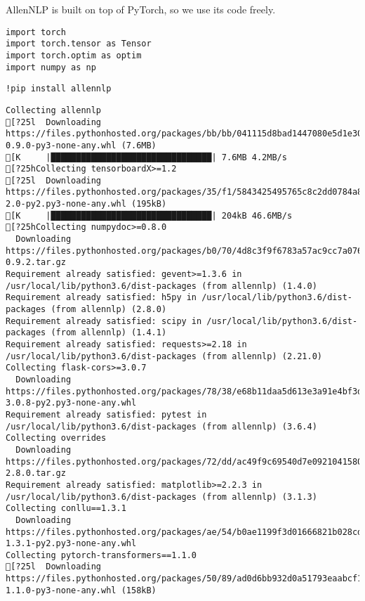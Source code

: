 \documentclass[
]{article}
\begin{document}
AllenNLP is built on top of PyTorch, so we use its code freely.

\begin{verbatim}
import torch
import torch.tensor as Tensor
import torch.optim as optim
import numpy as np
\end{verbatim}

\begin{verbatim}
!pip install allennlp
\end{verbatim}

\begin{verbatim}
Collecting allennlp
[?25l  Downloading https://files.pythonhosted.org/packages/bb/bb/041115d8bad1447080e5d1e30097c95e4b66e36074277afce8620a61cee3/allennlp-0.9.0-py3-none-any.whl (7.6MB)
[K     |████████████████████████████████| 7.6MB 4.2MB/s 
[?25hCollecting tensorboardX>=1.2
[?25l  Downloading https://files.pythonhosted.org/packages/35/f1/5843425495765c8c2dd0784a851a93ef204d314fc87bcc2bbb9f662a3ad1/tensorboardX-2.0-py2.py3-none-any.whl (195kB)
[K     |████████████████████████████████| 204kB 46.6MB/s 
[?25hCollecting numpydoc>=0.8.0
  Downloading https://files.pythonhosted.org/packages/b0/70/4d8c3f9f6783a57ac9cc7a076e5610c0cc4a96af543cafc9247ac307fbfe/numpydoc-0.9.2.tar.gz
Requirement already satisfied: gevent>=1.3.6 in /usr/local/lib/python3.6/dist-packages (from allennlp) (1.4.0)
Requirement already satisfied: h5py in /usr/local/lib/python3.6/dist-packages (from allennlp) (2.8.0)
Requirement already satisfied: scipy in /usr/local/lib/python3.6/dist-packages (from allennlp) (1.4.1)
Requirement already satisfied: requests>=2.18 in /usr/local/lib/python3.6/dist-packages (from allennlp) (2.21.0)
Collecting flask-cors>=3.0.7
  Downloading https://files.pythonhosted.org/packages/78/38/e68b11daa5d613e3a91e4bf3da76c94ac9ee0d9cd515af9c1ab80d36f709/Flask_Cors-3.0.8-py2.py3-none-any.whl
Requirement already satisfied: pytest in /usr/local/lib/python3.6/dist-packages (from allennlp) (3.6.4)
Collecting overrides
  Downloading https://files.pythonhosted.org/packages/72/dd/ac49f9c69540d7e09210415801a05d0a54d4d0ca8401503c46847dacd3a0/overrides-2.8.0.tar.gz
Requirement already satisfied: matplotlib>=2.2.3 in /usr/local/lib/python3.6/dist-packages (from allennlp) (3.1.3)
Collecting conllu==1.3.1
  Downloading https://files.pythonhosted.org/packages/ae/54/b0ae1199f3d01666821b028cd967f7c0ac527ab162af433d3da69242cea2/conllu-1.3.1-py2.py3-none-any.whl
Collecting pytorch-transformers==1.1.0
[?25l  Downloading https://files.pythonhosted.org/packages/50/89/ad0d6bb932d0a51793eaabcf1617a36ff530dc9ab9e38f765a35dc293306/pytorch_transformers-1.1.0-py3-none-any.whl (158kB)

\end{verbatim}
\end{document}
